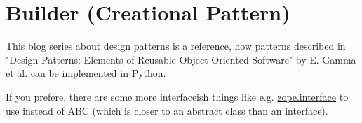 \documentclass{article}
\begin{document}
  \section{Builder (Creational Pattern)}

  This blog series about design patterns is a reference, how patterns
  described in "Design Patterns: Elements of Reusable Object-Oriented Software"
  by E. Gamma et al. can be implemented in Python.

  If you prefere, there are some more interfaceish things like e.g.
  \href{https://zopeinterface.readthedocs.io/en/latest/index.html}{zope.interface}
  to use instead of ABC (which is closer to an abstract class than an interface).

  \subsection{}
\end{document}
